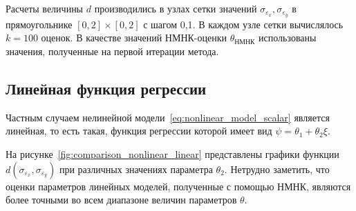 Расчеты величины \( d \) производились в узлах сетки значений
\( \sigma_{\varepsilon_x}, \sigma_{\varepsilon_y} \) в прямоугольнике
\( [0, 2] \times [0, 2] \) с шагом 0{,}1.
В каждом узле сетки вычислялось \( k = 100 \) оценок.
В качестве значений НМНК-оценки \( \theta_{\text{НМНК}} \)
использованы значения, полученные на первой итерации метода.

\vspace{2\baselineskip}
\subsection{Линейная функция регрессии}

Частным случаем нелинейной модели~\eqref{eq:nonlinear_model_scalar} является линейная,
то есть такая, функция регрессии которой имеет вид \( \psi = \theta_1 + \theta_2 \xi \).

На рисунке~\ref{fig:comparison_nonlinear_linear}
представлены графики функции \( d(\sigma_{\varepsilon_x}, \sigma_{\varepsilon_y}) \)
при различных значениях параметра \( \theta_2 \).
Нетрудно заметить, что оценки параметров линейных моделей,
полученные с помощью НМНК, являются более точными во всем диапазоне
величин параметров \( \theta \).

